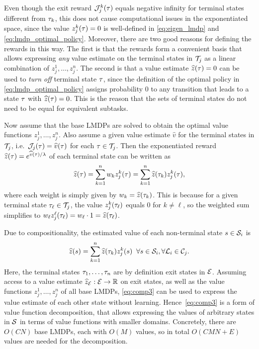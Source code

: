 Even though the exit reward $\mathcal{J}_j^k(\tau)$ equals negative infinity for terminal states different from $\tau_k$, this does not cause computational issues in the exponentiated space, since the value $z_j^k(\tau)=0$ is well-defined in \eqref{eq:eigen_lmdp} and \eqref{eq:lmdp_optimal_policy}.
Moreover, there are two good reasons for defining the rewards in this way. The first is that the rewards form a convenient basis that allows expressing {\em any} value estimate on the terminal states in $\mathcal{T}_j$ as a linear combination of $z_j^1,\ldots,z_j^n$.
The second is that a value estimate $\widehat{z}(\tau)=0$ can be used to {\em turn off} terminal state $\tau$, since the definition of the optimal policy in \eqref{eq:lmdp_optimal_policy} assigns probability $0$ to any transition that leads to a state $\tau$ with $\widehat{z}(\tau)=0$. %
This is the reason that the sets of terminal states do not need to be equal for equivalent subtasks.

Now assume that the base LMDPs are solved to obtain the optimal value functions $z_j^1,\ldots,z_j^n$. Also assume a given value estimate $\widehat{v}$ for the terminal states in $\mathcal{T}_j$, i.e.~$\mathcal{J}_j(\tau)=\widehat{v}(\tau)$ for each $\tau\in\mathcal{T}_j$. Then the exponentiated reward $\widehat{z}(\tau)=e^{\widehat{v}(\tau)/\lambda}$ of each terminal state can be written as
\begin{equation}\label{eq:comp}
\widehat{z}(\tau) = \sum_{k=1}^n w_kz_j^k(\tau) = \sum_{k=1}^n \widehat{z}(\tau_k) z_j^k(\tau),
\end{equation}
where each weight is simply given by $w_k=\widehat{z}(\tau_k)$. This is because for a given terminal state $\tau_\ell\in\mathcal{T}_j$, the value $z_j^k(\tau_\ell)$ equals $0$ for $k\neq \ell$, so the weighted sum simplifies to $w_\ell z_j^\ell(\tau_\ell)=w_\ell\cdot 1=\widehat{z}(\tau_\ell)$.

Due to compositionality, the estimated value of each non-terminal state $s\in\mathcal{S}_i$ is
\begin{align}\label{eq:comp3}
\widehat{z}(s)=\sum_{k=1}^n \widehat{z}(\tau_k) z_j^k(s) \;\; \forall s\in\mathcal{S}_i,\forall\mathcal{L}_i\in\mathcal{C}_j.
\end{align}
Here, the terminal states $\tau_1,\ldots,\tau_n$ are by definition exit states in $\mathcal{E}$. Assuming access to a value estimate $\widehat{z}_{\mathcal{E}}:\mathcal{E}\rightarrow\mathbb{R}$ on exit states, as well as the value functions $z_j^1,\ldots,z_j^n$ of all base LMDPs, \eqref{eq:comp3} can be used to express the value estimate of each other state without learning. Hence~\eqref{eq:comp3} is a form of value function decomposition, that allows expressing the values of arbitrary states in $\mathcal{S}$ in terms of value functions with smaller domains. Concretely, there are $O(CN)$ base LMDPs, each with $O(M)$ values, so in total $O(CMN+E)$ values are needed for the decomposition.

